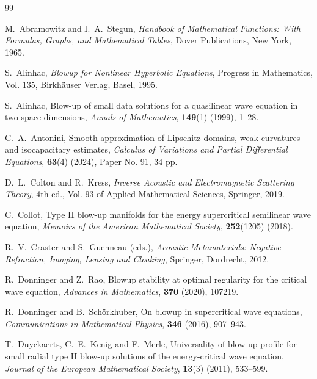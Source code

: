 \documentclass[11pt,reqno,oneside]{amsart}
\newcommand{\Blu}[1]{{\color{blue}#1}}
\numberwithin{equation}{section}
\theoremstyle{definition}
\theoremstyle{remark}
\numberwithin{equation}{section}
\begin{document}
	
	\medskip
	
\begin{thebibliography}{99}
	
	M.~Abramowitz and I.~A.~Stegun, 
	\textit{Handbook of Mathematical Functions: With Formulas, Graphs, and Mathematical Tables}, 
	Dover Publications, New York, 1965.
	
	S.~Alinhac,
	\textit{Blowup for Nonlinear Hyperbolic Equations},
	Progress in Mathematics, Vol. 135,
	Birkhäuser Verlag, Basel, 1995.
	
	S.~Alinhac, 
	Blow-up of small data solutions for a quasilinear wave equation in two space dimensions, 
	\textit{Annals of Mathematics}, 
	\textbf{149}(1) (1999), 1--28.
	
	C.~A.~Antonini, 
	Smooth approximation of Lipschitz domains, weak curvatures and isocapacitary estimates, 
	\textit{Calculus of Variations and Partial Differential Equations}, 
	\textbf{63}(4) (2024), Paper No. 91, 34 pp.
	
	D.~L.~Colton and R.~Kress, 
	\textit{Inverse Acoustic and Electromagnetic Scattering Theory}, 
	4th ed., 
	Vol. 93 of Applied Mathematical Sciences, 
	Springer, 2019.
	
	C.~Collot, 
	Type II blow-up manifolds for the energy supercritical semilinear wave equation, 
	\textit{Memoirs of the American Mathematical Society}, 
	\textbf{252}(1205) (2018).
	
	R.~V.~Craster and S.~Guenneau (eds.), 
	\textit{Acoustic Metamaterials: Negative Refraction, Imaging, Lensing and Cloaking}, 
	Springer, Dordrecht, 2012.
	
	R.~Donninger and Z.~Rao, 
	Blowup stability at optimal regularity for the critical wave equation,
	\textit{Advances in Mathematics}, 
	\textbf{370} (2020), 107219.
	
	R.~Donninger and B.~Sch\"orkhuber,
	On blowup in supercritical wave equations,
	\textit{Communications in Mathematical Physics}, 
	\textbf{346} (2016), 907--943.
	
	T.~Duyckaerts, C.~E.~Kenig and F.~Merle, 
	Universality of blow-up profile for small radial type II blow-up solutions of the energy-critical wave equation, 
	\textit{Journal of the European Mathematical Society}, 
	\textbf{13}(3) (2011), 533--599.
	

\end{thebibliography}
\end{document}
